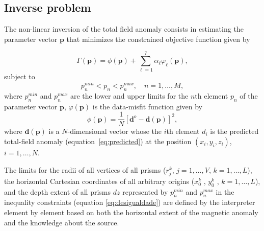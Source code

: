 \documentclass[extra,mreferee]{gji}
\begin{document}
\subsection{Inverse problem}

The non-linear inversion of the total field anomaly consists in estimating the parameter vector $\mathbf{p}$ that minimizes the constrained objective function given by

\begin{equation}
\Gamma (\mathbf{p}) = \phi (\mathbf{p}) + \sum\limits^{7}_{\ell =1}\alpha_{\ell}\varphi_{\ell}(\mathbf{p}),
\label{eq:gamma}
\end{equation}
subject to
\begin{equation}\label{eq:desigualdade}
p_{n }^{min} < p_n < p_n^{max},\quad n =1, \dots, M,
\end{equation}
where $p_{n }^{min}$ and $p_n^{max}$ are the lower and upper limits for the $n$th element $p_n$ of the parameter vector $\mathbf{p}$, $\varphi (\mathbf{p})$ is the data-misfit function given by
\begin{equation}\label{eq:misfit}
\phi (\mathbf{p}) = \frac{1}{N}[\mathbf{d}^{o} - \mathbf{d}(\mathbf{p})]^2,
\end{equation}
where $\mathbf{d}(\mathbf{p})$ is a $N$-dimensional vector whose the $i$th element $d_i$ is the predicted total-field anomaly (equation~\ref{eq:predicted}) at the position $(x_i,y_i,z_i)$, $i = 1,\dots, N$.

The limits for the radii of all vertices of all prisms ($r^k_j$, $j=1,\dots , V$, $k=1,\dots ,L$), the horizontal Cartesian coordinates of all
arbitrary origins ($x_0^k$ , $y_0^k$ , $k = 1, \dots, L$), and the depth extent of all prisms $dz$ represented by $p_{n }^{min}$ and $p_n^{max}$ in the inequality constraints (equation \ref{eq:desigualdade}) are defined by the interpreter element by element based on both the horizontal extent of the magnetic anomaly and the knowledge about the source. 
\end{document}
